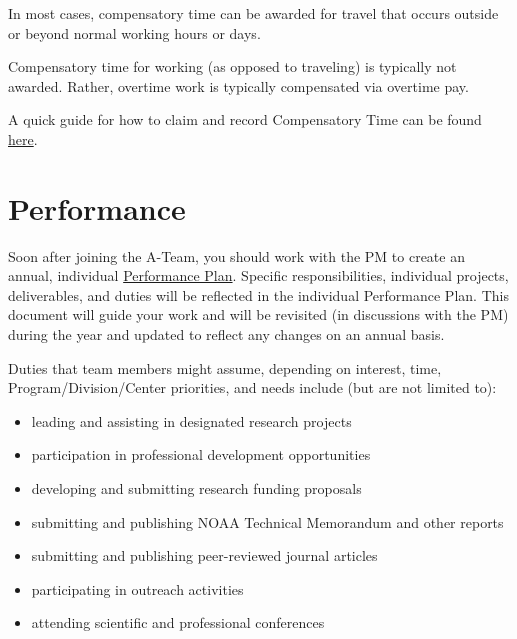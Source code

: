 \documentclass[
  letterpaper,
  DIV=11,
  numbers=noendperiod]{scrreprt}
\providecommand{\tightlist}{%
  \setlength{\itemsep}{0pt}\setlength{\parskip}{0pt}}\usepackage{longtable,booktabs,array}
\begin{document}
In most cases, compensatory time can be awarded for travel that occurs
outside or beyond normal working hours or days.

Compensatory time for working (as opposed to traveling) is typically not
awarded. Rather, overtime work is typically compensated via overtime
pay.

A quick guide for how to claim and record Compensatory Time can be found
\href{https://docs.google.com/document/d/1BdvL0mbBE0JY5HkDjdoi5RhCc0rn3G0SfXFHeo03nzY/edit}{here}.

\hypertarget{sec-perf}{%
\section{Performance}\label{sec-perf}}

Soon after joining the A-Team, you should work with the PM to create an
annual, individual
\href{https://drive.google.com/file/d/18veCUTjncQVhRY6jOou9kclKWXJssOca/view?pli=1}{Performance
Plan}. Specific responsibilities, individual projects, deliverables, and
duties will be reflected in the individual Performance Plan. This
document will guide your work and will be revisited (in discussions with
the PM) during the year and updated to reflect any changes on an annual
basis.

Duties that team members might assume, depending on interest, time,
Program/Division/Center priorities, and needs include (but are not
limited to):

\begin{itemize}
\tightlist
\item
  leading and assisting in designated research projects\\
\item
  participation in professional development opportunities\\
\item
  developing and submitting research funding proposals\\
\item
  submitting and publishing NOAA Technical Memorandum and other
  reports\\
\item
  submitting and publishing peer-reviewed journal articles
\item
  participating in outreach activities\\
\item
  attending scientific and professional conferences
\end{itemize}
\end{document}
